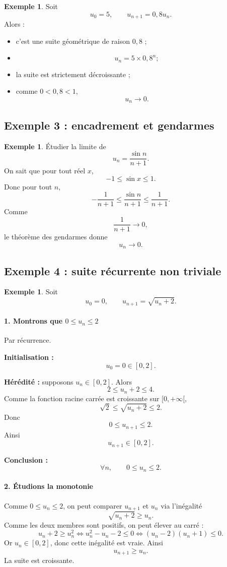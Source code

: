 \documentclass[11pt,a4paper]{article}
\theoremstyle{definition}
\newtheorem{exemple}[definition]{Exemple}
\theoremstyle{plain}
\theoremstyle{remark}
\begin{document}
\begin{exemple}
Soit
\[
u_0=5,\qquad u_{n+1}=0,8u_n.
\]
Alors :
\begin{itemize}[leftmargin=0.8cm]
    \item c'est une suite géométrique de raison $0,8$ ;
    \item
    \[
    u_n=5\times 0,8^n ;
    \]
    \item la suite est strictement décroissante ;
    \item comme $0<0,8<1$,
    \[
    u_n\to0.
    \]
\end{itemize}
\end{exemple}

\subsection{Exemple 3 : encadrement et gendarmes}

\begin{exemple}
Étudier la limite de
\[
u_n=\frac{\sin n}{n+1}.
\]
On sait que pour tout réel $x$,
\[
-1\leq \sin x\leq1.
\]
Donc pour tout $n$,
\[
-\frac1{n+1}\leq \frac{\sin n}{n+1}\leq \frac1{n+1}.
\]
Comme
\[
\frac1{n+1}\to0,
\]
le théorème des gendarmes donne
\[
u_n\to0.
\]
\end{exemple}

\subsection{Exemple 4 : suite récurrente non triviale}

\begin{exemple}
Soit
\[
u_0=0,\qquad u_{n+1}=\sqrt{u_n+2}.
\]
\end{exemple}

\paragraph{1. Montrons que \(0\leq u_n\leq 2\)}
Par récurrence.

\textbf{Initialisation :}
\[
u_0=0\in[0,2].
\]

\textbf{Hérédité :} supposons $u_n\in[0,2]$. Alors
\[
2\leq u_n+2\leq4.
\]
Comme la fonction racine carrée est croissante sur $[0,+\infty[$,
\[
\sqrt2\leq \sqrt{u_n+2}\leq2.
\]
Donc
\[
0\leq u_{n+1}\leq2.
\]
Ainsi
\[
u_{n+1}\in[0,2].
\]

\textbf{Conclusion :}
\[
\forall n,\qquad 0\leq u_n\leq2.
\]

\paragraph{2. Étudions la monotonie}
Comme $0\leq u_n\leq2$, on peut comparer $u_{n+1}$ et $u_n$ via l'inégalité
\[
\sqrt{u_n+2}\geq u_n.
\]
Comme les deux membres sont positifs, on peut élever au carré :
\[
u_n+2\geq u_n^2
\iff
u_n^2-u_n-2\leq0
\iff
(u_n-2)(u_n+1)\leq0.
\]
Or $u_n\in[0,2]$, donc cette inégalité est vraie. Ainsi
\[
u_{n+1}\geq u_n.
\]
La suite est croissante.
\end{document}
